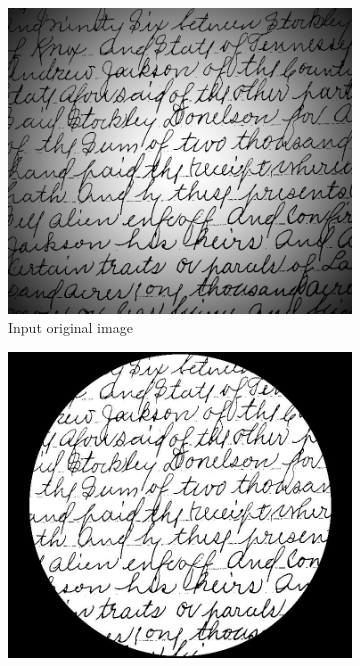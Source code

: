 \documentclass[UTF8]{ctexart}
\begin{document}
\begin{figure}[htbp]
    \centering
    \begin{subfigure}{0.3\textwidth}
        \centering
        \includegraphics[width=\linewidth]{spot_shaded_text_image.jpg}
        \caption{Input original image}
    \end{subfigure}%
    \hfill
    \begin{subfigure}{0.3\textwidth}
        \centering
        \includegraphics[width=\linewidth]{global_otsu.jpg}

\end{subfigure}
\end{figure}
\end{document}
